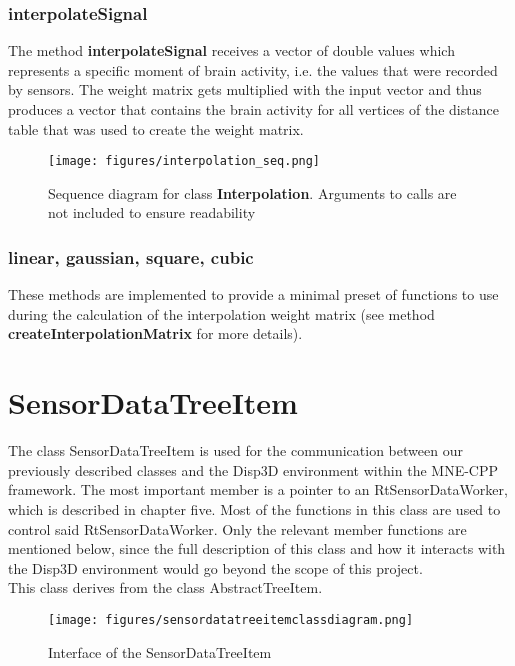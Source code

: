 \subsubsection{interpolateSignal}
The method \textbf{interpolateSignal} receives a vector of double values which represents a specific moment of brain activity, i.e. the values that were recorded by sensors. The weight matrix gets multiplied with the input vector and thus produces a vector that contains the brain activity for all vertices of the distance table that was used to create the weight matrix.

\begin{figure}[h]
	\begin{center}
		\texttt{[image: figures/interpolation\_seq.png]}
		\caption{Sequence diagram for class \textbf{Interpolation}. Arguments to calls are not included to ensure readability}
	\end{center}
\end{figure}

\subsubsection{linear, gaussian, square, cubic}
These methods are implemented to provide a minimal preset of functions to use during the calculation of the interpolation weight matrix (see method \textbf{createInterpolationMatrix} for more details).

\clearpage

\section{SensorDataTreeItem}

The class SensorDataTreeItem is used for the communication between our previously described classes and the Disp3D environment within the MNE-CPP framework. The most important member is a pointer to an RtSensorDataWorker, which is described in chapter five. Most of the functions in this class are used to control said RtSensorDataWorker. Only the relevant member functions are mentioned below, since the full description of this class and how it interacts with the Disp3D environment would go beyond the scope of this project.\\
This class derives from the class AbstractTreeItem.

\begin{figure}[h]
	\begin{center}
		\texttt{[image: figures/sensordatatreeitemclassdiagram.png]}
		\caption{Interface of the SensorDataTreeItem}
	\end{center}
\end{figure}

